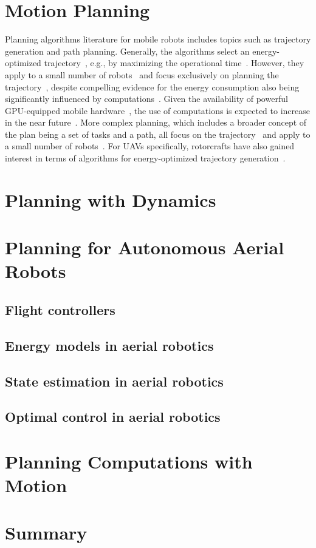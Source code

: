 \section{\color{cyan}Motion Planning}
\label{sec:soa-motion-pl}

Planning algorithms literature for mobile robots includes topics such as trajectory generation and path planning. Generally, the algorithms select an energy-optimized trajectory~\cite{mei2004energy}, e.g., by maximizing the operational time~\cite{wahab2015energy}. However, they apply to a small number of robots~\cite{kim2005energy} and focus exclusively on planning the trajectory~\cite{kim2008minimum}, despite compelling evidence for the energy consumption also being significantly influenced by computations~\cite{mei2005case}. Given the availability of powerful GPU-equipped mobile hardware~\cite{rizvi2017general}, the use of computations is expected to increase in the near future~\cite{abramov2012real,satria2016real,jaramillo2019visual}. More complex planning, which includes a broader concept of the plan being a set of tasks and a path, all focus on the trajectory~\cite{mei2005case,mei2006deployment} and apply to a small number of robots~\cite{sadrpour2013mission,sadrpour2013experimental}. For UAVs specifically, rotorcrafts have also gained interest in terms of algorithms for energy-optimized trajectory generation~\cite{morbidi2016minimum,kreciglowa2017energy}. 


\section{\color{red}Planning with Dynamics}
\label{sec:soa-dynamics-pl}

\section{\color{red}Planning for Autonomous Aerial Robots}
\label{sec:soa-aerial-pl}

\subsection{\color{red}Flight controllers}

\subsection{\color{orange}Energy models in aerial robotics}

\subsection{\color{orange}State estimation in aerial robotics}

\subsection{\color{orange}Optimal control in aerial robotics}


\section{\color{red}Planning Computations with Motion}
\label{sec:soa-comp-motion-pl}

\section{\color{red}Summary}

